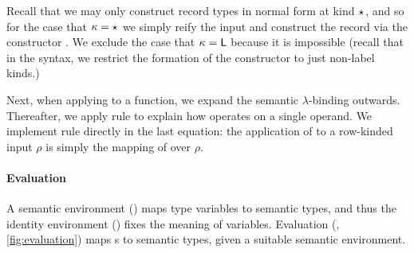 \documentclass[sigplan,screen]{acmart}
\begin{document}
Recall that we may only construct record types in normal form at kind $\star_{}$, and so for the case that $\kappa = \star_{}$ we simply reify the input and construct the record via the  constructor . We exclude the case that $\kappa = \mathsf{L}$ because it is impossible (recall that in the  syntax, we restrict the formation of the  constructor to just non-label kinds.) 

Next, when applying  to a function, we expand the semantic $\lambda$-binding outwards. Thereafter, we apply rule  to explain how  operates on a single operand. We implement rule \errule{$\Pi$} directly in the last equation: the application of  to a row-kinded input $\rho$ is simply the mapping of   over $\rho$.

\paragraph{Evaluation}
A semantic environment () maps type variables to semantic types, and thus the identity environment () fixes the meaning of variables. Evaluation (, \cref{fig:evaluation}) maps s to semantic types, given a suitable semantic environment.

\begin{code}%
%
\>[2]\AgdaSpace{}%
\AgdaSymbol{:}\AgdaSpace{}%
\AgdaSpace{}%
\AgdaSpace{}%
\AgdaSpace{}%
\AgdaSpace{}%
\<%
\\
%
\>[2]\AgdaSpace{}%
\AgdaSpace{}%
\AgdaSpace{}%
\AgdaSymbol{=}\AgdaSpace{}%
\AgdaSpace{}%
\AgdaSymbol{\{}\AgdaSymbol{\}}\AgdaSpace{}%
\AgdaSpace{}%
\AgdaSpace{}%
\AgdaSpace{}%
\AgdaSpace{}%
\AgdaSpace{}%
\AgdaSpace{}%
\AgdaSpace{}%
\<%
\\
%
\>[2]\AgdaSpace{}%
\AgdaSymbol{:}\AgdaSpace{}%
\AgdaSpace{}%
\AgdaSpace{}%
\<%
\\
%
\>[2]\AgdaSpace{}%
\AgdaSymbol{=}\AgdaSpace{}%
\AgdaSpace{}%
\AgdaSpace{}%
\<%
\end{code}
\end{document}
